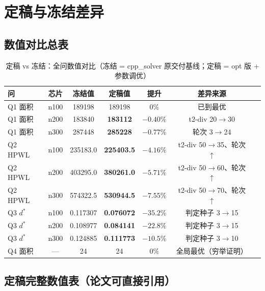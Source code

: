 \documentclass[12pt,a4paper]{article}
\begin{document}
\section{定稿与冻结差异}
\label{sec:diff}

\subsection{数值对比总表}

\begin{table}[H]
\centering
\small
\caption{定稿 vs 冻结：全问数值对比（冻结 = cpp\_solver 原交付基线；定稿 = opt 版 + 参数调优）}
\begin{tabular}{lcccccc}
\toprule
问 & 芯片 & 冻结值 & 定稿值 & 提升 & 差异来源 \\
\midrule
Q1 面积 & n100 & 189198 & 189198 & $0\%$ & 已到最优 \\
Q1 面积 & n200 & 183840 & \textbf{183112} & $-0.40\%$ & t2-div 20$\to$30 \\
Q1 面积 & n300 & 287448 & \textbf{285228} & $-0.77\%$ & 轮次 3$\to$24 \\
\midrule
Q2 HPWL & n100 & 235183.0 & \textbf{225403.5} & $-4.16\%$ & t2-div 50$\to$35、轮次 $\uparrow$ \\
Q2 HPWL & n200 & 403295.0 & \textbf{380261.0} & $-5.71\%$ & t2-div 50$\to$60、轮次 $\uparrow$ \\
Q2 HPWL & n300 & 574322.5 & \textbf{530944.5} & $-7.55\%$ & t2-div 50$\to$70、轮次 $\uparrow$ \\
\midrule
Q3 $d^*$ & n100 & 0.117307 & \textbf{0.076072} & $-35.2\%$ & 判定种子 3$\to$15 \\
Q3 $d^*$ & n200 & 0.108977 & \textbf{0.084141} & $-22.8\%$ & 判定种子 3$\to$15 \\
Q3 $d^*$ & n300 & 0.124885 & \textbf{0.111773} & $-10.5\%$ & 判定种子 3$\to$10 \\
\midrule
Q4 面积 & --- & 24 & 24 & $0\%$ & 全局最优（穷举证明） \\
\bottomrule
\end{tabular}
\end{table}

\subsection{定稿完整数值表（论文可直接引用）}
\end{document}
